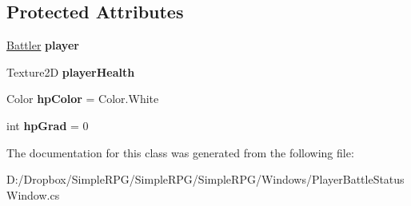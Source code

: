 \subsection*{Protected Attributes}
\begin{DoxyCompactItemize}
\item 
\hypertarget{class_simple_r_p_g_1_1_windows_1_1_player_battle_status_window_a3dc74bda60f07aa2648e52c9d1d0ae64}{\hyperlink{class_simple_r_p_g_1_1_battler}{Battler} {\bfseries player}}\label{class_simple_r_p_g_1_1_windows_1_1_player_battle_status_window_a3dc74bda60f07aa2648e52c9d1d0ae64}

\item 
\hypertarget{class_simple_r_p_g_1_1_windows_1_1_player_battle_status_window_a26394a47b764a11d91455d3f3212efd0}{Texture2\+D {\bfseries player\+Health}}\label{class_simple_r_p_g_1_1_windows_1_1_player_battle_status_window_a26394a47b764a11d91455d3f3212efd0}

\item 
\hypertarget{class_simple_r_p_g_1_1_windows_1_1_player_battle_status_window_a62f2437b21ed476211989db68f3e77f8}{Color {\bfseries hp\+Color} = Color.\+White}\label{class_simple_r_p_g_1_1_windows_1_1_player_battle_status_window_a62f2437b21ed476211989db68f3e77f8}

\item 
\hypertarget{class_simple_r_p_g_1_1_windows_1_1_player_battle_status_window_a07a3053b58268a4d79ee3f1f62c2a53f}{int {\bfseries hp\+Grad} = 0}\label{class_simple_r_p_g_1_1_windows_1_1_player_battle_status_window_a07a3053b58268a4d79ee3f1f62c2a53f}

\end{DoxyCompactItemize}


The documentation for this class was generated from the following file\+:\begin{DoxyCompactItemize}
\item 
D\+:/\+Dropbox/\+Simple\+R\+P\+G/\+Simple\+R\+P\+G/\+Simple\+R\+P\+G/\+Windows/Player\+Battle\+Status\+Window.\+cs\end{DoxyCompactItemize}
